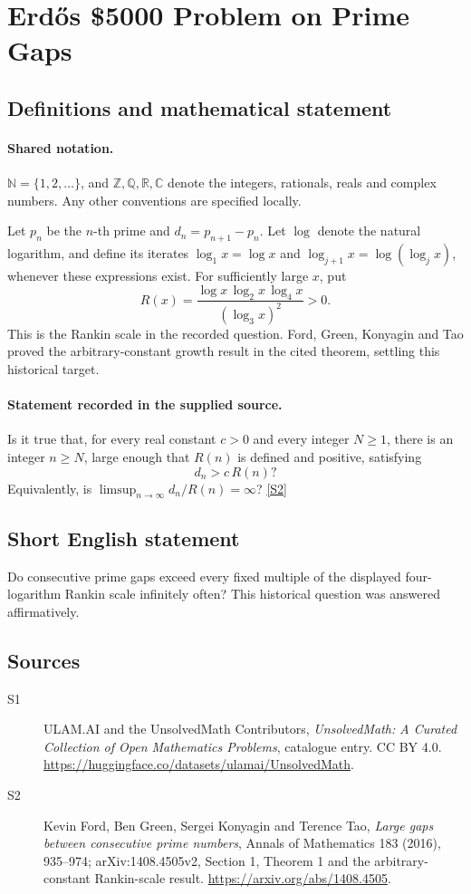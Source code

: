 \documentclass[11pt]{article}
\newcommand{\sref}[2]{\hyperlink{source:#1:#2}{[S#2]}}
\begin{document}
\section{Erdős \$5000 Problem on Prime Gaps}\label{statement}

\subsection{Definitions and mathematical statement}

\paragraph{Shared notation.}$\mathbb N=\{1,2,\ldots\}$, and $\mathbb Z,\mathbb Q,\mathbb R,\mathbb C$ denote the integers, rationals, reals and complex numbers. Any other conventions are specified locally.


Let \(p_n\) be the \(n\)-th prime and
\(d_n=p_{n+1}-p_n\). Let \(\log\) denote the natural logarithm,
and define its iterates \(\log_1x=\log x\) and
\(\log_{j+1}x=\log(\log_jx)\), whenever these expressions exist.
For sufficiently large \(x\), put
\[
                     R(x)=\frac{\log x\,\log_2x\,\log_4x}
                                       {(\log_3x)^2}>0.
\]
This is the Rankin scale in the recorded question.
Ford, Green, Konyagin and Tao proved the arbitrary-constant growth
result in the cited theorem, settling this historical target.
\paragraph{Statement recorded in the supplied source.}
Is it true that, for every real constant \(c>0\) and every
integer \(N\ge1\), there is an integer \(n\ge N\), large enough
that \(R(n)\) is defined and positive, satisfying
\[
                         d_n>c\,R(n)?
\]
Equivalently, is \(\limsup_{n\to\infty}d_n/R(n)=\infty\)? \sref{statement}{2}
\subsection{Short English statement}
Do consecutive prime gaps exceed every fixed multiple of the displayed four-logarithm Rankin scale infinitely often? This historical question was answered affirmatively.
\subsection{Sources}
\begin{description}
\item[\hypertarget{source:statement:1}{S1}] ULAM.AI and the UnsolvedMath Contributors, \emph{UnsolvedMath: A Curated Collection of Open Mathematics Problems}, catalogue entry. CC BY 4.0. \url{https://huggingface.co/datasets/ulamai/UnsolvedMath}.
\item[\hypertarget{source:statement:2}{S2}] Kevin Ford, Ben Green, Sergei Konyagin and Terence Tao, \emph{Large gaps between consecutive prime numbers}, Annals of Mathematics 183 (2016), 935--974; arXiv:1408.4505v2, Section 1, Theorem 1 and the arbitrary-constant Rankin-scale result. \url{https://arxiv.org/abs/1408.4505}.
\end{description}
\label{end:statement}
\end{document}
